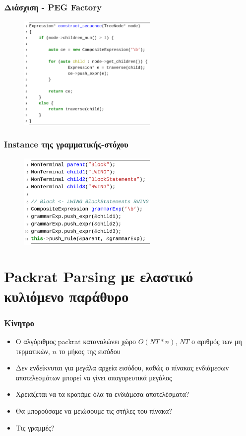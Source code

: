 \documentclass{beamer}
\begin{document}
\begin{frame}
  \frametitle{Διάσχιση - PEG Factory}
\begin{figure}[h]
    \centering
	\includegraphics[width=0.60\textwidth]{pics/traverse}
\end{figure} 
\end{frame}

\begin{frame}
  \frametitle{Instance της γραμματικής-στόχου}
\begin{figure}[h]
    \centering
	\includegraphics[width=0.60\textwidth]{pics/generated_instance}
\end{figure} 
\end{frame}
\fi
\section{Packrat Parsing με ελαστικό κυλιόμενο παράθυρο}

\begin{frame}
  \frametitle{Κίνητρο}
  \begin{itemize}
	\item O αλγόριθμος packrat καταναλώνει χώρο $O(NT * n)$, $NT$ ο αριθμός των μη τερματικών, $n$ το μήκος της εισόδου \pause
	\item Δεν ενδείκνυται για μεγάλα αρχεία εισόδου, καθώς ο πίνακας ενδιάμεσων αποτελεσμάτων μπορεί να γίνει απαγορευτικά μεγάλος \pause
	\item Χρειάζεται να τα κρατάμε όλα τα ενδιάμεσα αποτελέσματα? \pause
	\item Θα μπορούσαμε να μειώσουμε τις στήλες του πίνακα? \pause
	\item Τις γραμμές?
	\end{itemize}
  \end{frame}
\end{document}
